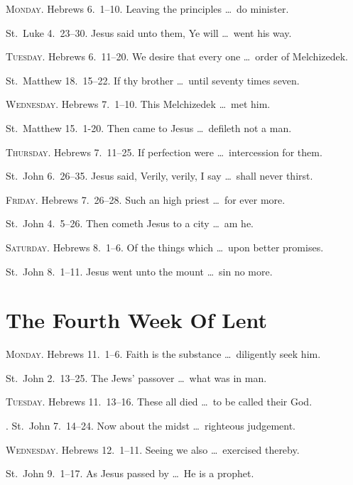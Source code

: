 {\scshape Monday.}  Hebrews 6.~1–10.   Leaving the principles \ldots\ do minister.

 St.~Luke 4.~23–30.   Jesus said unto them, Ye will \ldots\ went his way.

{\scshape Tuesday.}  Hebrews 6.~11–20.   We desire that every one \ldots\ order of Melchizedek.

 St.~Matthew 18.~15–22.   If thy brother \ldots\ until seventy times seven.

{\scshape Wednesday.}  Hebrews 7.~1–10.   This Melchizedek \ldots\ met him.

 St.~Matthew 15.~1-20.   Then came to Jesus \ldots\ defileth not a man.

{\scshape Thursday.}  Hebrews 7.~11–25.   If perfection were \ldots\ intercession for them.

 St.~John 6.~26–35.   Jesus said, Verily, verily, I say \ldots\ shall never thirst.

{\scshape Friday.}  Hebrews 7.~26–28.   Such an high priest \ldots\ for ever more.

 St.~John 4.~5–26.   Then cometh Jesus to a city \ldots\ am he.

{\scshape Saturday.}  Hebrews 8.~1–6.   Of the things which \ldots\ upon better promises.

 St.~John 8.~1–11.   Jesus went unto the mount \ldots\ sin no more.

\section{The Fourth Week Of Lent}

{\scshape Monday.}  Hebrews 11.~1–6.   Faith is the substance \ldots\ diligently seek him.

 St.~John 2.~13–25.   The Jews’ passover \ldots\ what was in man.

{\scshape Tuesday.}  Hebrews 11.~13–16.   These all died \ldots\ to be called their God.

. St.~John 7.~14–24.   Now about the midst \ldots\ righteous judgement.

{\scshape Wednesday.}  Hebrews 12.~1–11.   Seeing we also \ldots\ exercised thereby.

 St.~John 9.~1–17.   As Jesus passed by \ldots\ He is a prophet.

